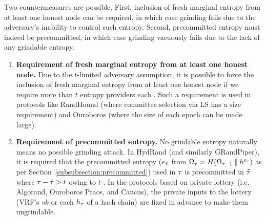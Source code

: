 Two countermeasures are possible. First, inclusion of fresh marginal entropy from at least one honest node can be required, in which case grinding fails due to the adversary's inability to control such entropy. Second, precommitted entropy must indeed be precommitted, in which case grinding vacuously fails due to the lack of any grindable entropy.
\begin{enumerate}
\item \textbf{Requirement of fresh marginal entropy from at least one honest node.} Due to the $t$-limited adversary assumption, it is possible to force the inclusion of fresh marginal entropy from at least one honest node if we require more than $t$ entropy providers each \epoch. Such a requirement is used in protocols like RandHound (where committee selection via LS has a size requirement) and Ouroboros (where the size of each epoch can be made large).
\item \textbf{Requirement of precommitted entropy.} No grindable entropy naturally means no possible grinding attack. In HydRand (and similarly GRandPiper), it is required that the precommitted entropy ($e_{\tilde{\tau}}$ from $\Omega_\tau = H(\Omega_{\tau - 1} \mathbin\Vert h^{e_{\tilde{\tau}}})$ as per Section~\ref{subsubsection:precommitted}) used in \epoch $\tau$ is precommitted in \epoch $\tilde{\tau}$ where $\tau - \tilde{\tau} > t$ owing to $t$-\interunpredictability. In the protocols based on private lottery (i.e. Algorand, Ouroboros Praos, and Caucus), the private inputs to the lottery (VRF's $sk$ or each $h_\tau$ of a hash chain) are fixed in advance to make them ungrindable.
\end{enumerate}
\fi

